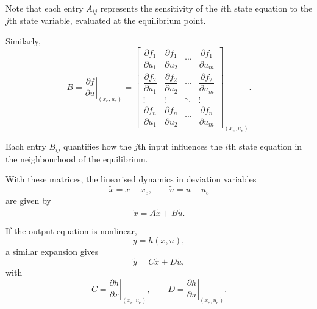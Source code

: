 Note that each entry $A_{ij}$ represents the sensitivity of the $i$th state equation to the $j$th state variable, evaluated at the equilibrium point.

Similarly, 
\[
B = \left.\frac{\partial f}{\partial u}\right|_{(x_e,u_e)} =
\left[
\begin{array}{cccc}
	\dfrac{\partial f_1}{\partial u_1} &
	\dfrac{\partial f_1}{\partial u_2} &
	\cdots &
	\dfrac{\partial f_1}{\partial u_m} \\[8pt]
	
	\dfrac{\partial f_2}{\partial u_1} &
	\dfrac{\partial f_2}{\partial u_2} &
	\cdots &
	\dfrac{\partial f_2}{\partial u_m} \\[4pt]
	
	\vdots & \vdots & \ddots & \vdots \\[4pt]
	
	\dfrac{\partial f_n}{\partial u_1} &
	\dfrac{\partial f_n}{\partial u_2} &
	\cdots &
	\dfrac{\partial f_n}{\partial u_m}
\end{array}
\right]_{(x_e,u_e)}.
\]

Each entry $B_{ij}$ quantifies how the $j$th input influences the $i$th state equation in the neighbourhood of the equilibrium.

\medskip
\noindent
With these matrices, the linearised dynamics in deviation variables
\[
\tilde{x} = x - x_e,
\qquad
\tilde{u} = u - u_e
\]
are given by
\[
\dot{\tilde{x}} = A \tilde{x} + B \tilde{u}.
\]

If the output equation is nonlinear,
\[
y = h(x,u),
\]
a similar expansion gives
\[
\tilde{y} = C \tilde{x} + D \tilde{u},
\]
with
\[
C = \left.\frac{\partial h}{\partial x}\right|_{(x_e,u_e)},
\qquad
D = \left.\frac{\partial h}{\partial u}\right|_{(x_e,u_e)}.
\]

\medskip


